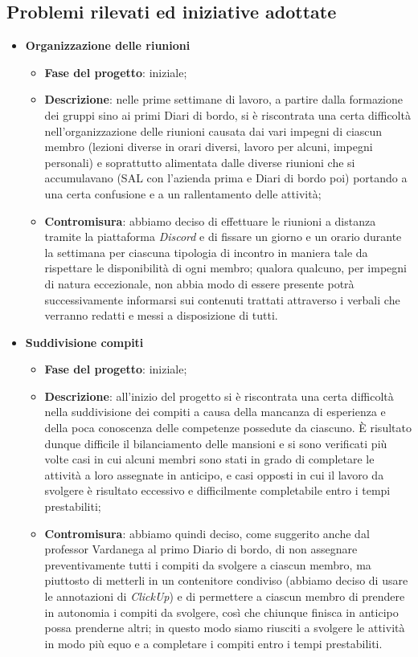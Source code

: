 \subsection{Problemi rilevati ed iniziative adottate}
\begin{itemize}
    \item \textbf{Organizzazione delle riunioni}
    \begin{itemize}
        \item \textbf{Fase del progetto}: iniziale;
        \item \textbf{Descrizione}: nelle prime settimane di lavoro, a partire dalla formazione dei gruppi sino ai primi Diari di bordo, si è riscontrata una certa difficoltà nell'organizzazione delle riunioni causata dai vari impegni di ciascun membro (lezioni diverse in orari diversi, lavoro per alcuni, impegni personali) e soprattutto alimentata dalle diverse riunioni che si accumulavano (SAL con l'azienda prima e Diari di bordo poi) portando a una certa confusione e a un rallentamento delle attività;
        \item \textbf{Contromisura}: abbiamo deciso di effettuare le riunioni a distanza tramite la piattaforma \textit{Discord} e di fissare un giorno e un orario durante la settimana per ciascuna tipologia di incontro in maniera tale da rispettare le disponibilità di ogni membro; qualora qualcuno, per impegni di natura eccezionale, non abbia modo di essere presente potrà successivamente informarsi sui contenuti trattati attraverso i verbali che verranno redatti e messi a disposizione di tutti.
    \end{itemize}
    \item \textbf{Suddivisione compiti}
    \begin{itemize}
        \item \textbf{Fase del progetto}: iniziale;
        \item \textbf{Descrizione}: all'inizio del progetto si è riscontrata una certa difficoltà nella suddivisione dei compiti a causa della mancanza di esperienza e della poca conoscenza delle competenze possedute da ciascuno. È risultato dunque difficile il bilanciamento delle mansioni e si sono verificati più volte casi in cui alcuni membri sono stati in grado di completare le attività a loro assegnate in anticipo, e casi opposti in cui il lavoro da svolgere è risultato eccessivo e difficilmente completabile entro i tempi prestabiliti;
        \item \textbf{Contromisura}: abbiamo quindi deciso, come suggerito anche dal professor Vardanega al primo Diario di bordo, di non assegnare preventivamente tutti i compiti da svolgere a ciascun membro, ma piuttosto di metterli in un contenitore condiviso (abbiamo deciso di usare le annotazioni di \textit{ClickUp}) e di permettere a ciascun membro di prendere in autonomia i compiti da svolgere, così che chiunque finisca in anticipo possa prenderne altri; in questo modo siamo riusciti a svolgere le attività in modo più equo e a completare i compiti entro i tempi prestabiliti.

\end{itemize}
\end{itemize}
